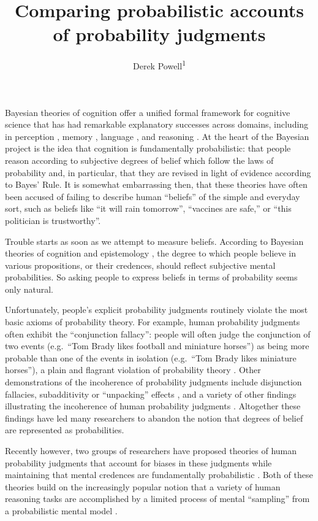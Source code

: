 \documentclass[
  english,
  man,floatsintext]{apa6}
\title{Comparing probabilistic accounts of probability judgments}
\author{Derek Powell\textsuperscript{1}}
\date{}
\affiliation{\vspace{0.5cm}\textsuperscript{1} Arizona State University, School of Social and Behavioral Sciences}
\begin{document}
\maketitle

Bayesian theories of cognition offer a unified formal framework for cognitive science \autocite{tenenbaum.etal2011} that has had remarkable explanatory successes across domains, including in perception \autocite[e.g.][]{kersten.etal2004}, memory \autocite[e.g.][]{anderson1991}, language \autocite[e.g.][]{xu.tenenbaum2007}, and reasoning \autocite[e.g.][]{lu.etal2012}. At the heart of the Bayesian project is the idea that cognition is fundamentally probabilistic: that people reason according to subjective degrees of belief which follow the laws of probability and, in particular, that they are revised in light of evidence according to Bayes' Rule. It is somewhat embarrassing then, that these theories have often been accused of failing to describe human ``beliefs'' of the simple and everyday sort, such as beliefs like ``it will rain tomorrow'', ``vaccines are safe,'' or ``this politician is trustworthy''.

Trouble starts as soon as we attempt to measure beliefs. According to Bayesian theories of cognition and epistemology \autocite{jaynes2003}, the degree to which people believe in various propositions, or their credences, should reflect subjective mental probabilities. So asking people to express beliefs in terms of probability seems only natural.

Unfortunately, people's explicit probability judgments routinely violate the most basic axioms of probability theory. For example, human probability judgments often exhibit the ``conjunction fallacy'': people will often judge the conjunction of two events (e.g.~``Tom Brady likes football and miniature horses'') as being more probable than one of the events in isolation (e.g.~``Tom Brady likes miniature horses''), a plain and flagrant violation of probability theory \autocite{tversky.kahneman1983}. Other demonstrations of the incoherence of probability judgments include disjunction fallacies, subadditivity or ``unpacking'' effects \autocite{tversky.koehler1994}, and a variety of other findings illustrating the incoherence of human probability judgments \autocite[for an accessible review, see][]{kahneman2013}. Altogether these findings have led many researchers to abandon the notion that degrees of belief are represented as probabilities.

Recently however, two groups of researchers have proposed theories of human probability judgments that account for biases in these judgments while maintaining that mental credences are fundamentally probabilistic \autocite{costello.watts2014,zhu.etal2020}. Both of these theories build on the increasingly popular notion that a variety of human reasoning tasks are accomplished by a limited process of mental ``sampling'' from a probabilistic mental model \autocites[see also][]{chater.etal2020,dasgupta.etal2017}.
\end{document}
